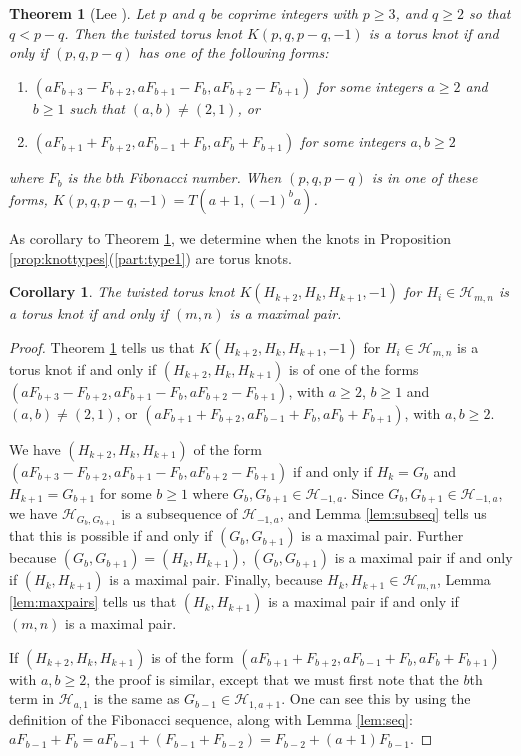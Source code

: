\documentclass{amsart}
\newtheorem{theorem}{Theorem}
\newtheorem{cor}{Corollary}
\begin{document}
\begin{theorem}[Lee \cite{LeeTTKTorus}]\label{thm:ttktorusqsmall}
Let $p$ and $q$ be coprime integers with $p\ge 3$, and $q \ge 2$ so that $q < p - q$. Then the twisted torus knot $K(p,q,p-q, -1)$ is a torus knot if and only if $(p,q,p-q)$ has one of the following forms:
\begin{enumerate}
\item $(aF_{b+3} - F_{b+2}, aF_{b+1}-F_b, aF_{b+2} - F_{b+1})$ for some integers $a \ge 2$ and $b \ge 1$ such that $(a, b) \neq (2, 1)$, or
\item $(aF_{b+1} + F_{b+2}, aF_{b-1} + F_b, a F_b + F_{b+1})$ for some integers $a, b \ge 2$
\end{enumerate}
where $F_b$ is the $b$th Fibonacci number. When $(p,q,p-q)$ is in one of these forms, $K(p,q,p-q,-1) = T(a+1, (-1)^b a)$.
\end{theorem}

As corollary to Theorem \ref{thm:ttktorusqsmall}, we determine when the knots in Proposition \ref{prop:knottypes}(\ref{part:type1}) are torus knots.

\begin{cor}
The twisted torus knot $K(H_{k+2}, H_{k}, H_{k+1}, -1)$ for $H_i \in \mathcal H_{m,n}$ is a torus knot if and only if $(m,n)$ is a maximal pair.
\end{cor}

\begin{proof}
Theorem \ref{thm:ttktorusqsmall} tells us that $K(H_{k+2}, H_{k}, H_{k+1}, -1)$ for $H_i \in \mathcal H_{m,n}$ is a torus knot if and only if $(H_{k+2}, H_{k}, H_{k+1})$ is of one of the forms $(aF_{b+3} - F_{b+2}, aF_{b+1}-F_b, aF_{b+2} - F_{b+1})$, with $a \ge 2$, $b \ge 1$ and $(a,b) \neq (2,1)$, or $(aF_{b+1} + F_{b+2}, aF_{b-1} + F_b, a F_b + F_{b+1})$, with  $a, b \ge 2$. 

We have $(H_{k+2}, H_{k}, H_{k+1})$ of the form $(aF_{b+3} - F_{b+2}, aF_{b+1}-F_b, aF_{b+2} - F_{b+1})$ if and only if
$H_k = G_b$ and $H_{k+1} = G_{b+1}$ for some $b \ge 1$ where $G_b, G_{b+1} \in \mathcal H_{-1, a}$. Since $G_b, G_{b+1} \in \mathcal H_{-1, a}$, we have $\mathcal H_{G_b, G_{b+1}}$ is a subsequence of $\mathcal H_{-1, a}$, and Lemma \ref{lem:subseq} tells us that this is possible if and only if $(G_b, G_{b+1})$ is a maximal pair. Further because $(G_b, G_{b+1}) = (H_k,H_{k+1})$,  $(G_b, G_{b+1})$ is a maximal pair if and only if  $(H_k,H_{k+1})$ is a maximal pair. Finally, because $H_k, H_{k+1} \in \mathcal H_{m,n}$, Lemma \ref{lem:maxpairs} tells us that $(H_k,H_{k+1})$ is a maximal pair if and only if $(m,n)$ is a maximal pair.

If $(H_{k+2}, H_{k}, H_{k+1})$ is of the form $(aF_{b+1} + F_{b+2}, aF_{b-1} + F_b, a F_b + F_{b+1})$ with $a,b \ge 2$, the proof is similar, except that we must first note that  the $b$th term in $ \mathcal H_{a,1}$ is the same as $G_{b-1} \in \mathcal H_{1, a+1}$. One can see this by using the definition of the Fibonacci sequence, along with Lemma \ref{lem:seq}: $aF_{b-1} + F_b =  aF_{b-1} + (F_{b-1} + F_{b-2}) =  F_{b-2} +(a+1)F_{b-1} $.

\end{proof}
\end{document}
